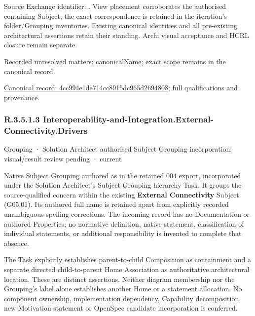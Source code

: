 Source Exchange identifier: \texttt{}. View placement corroborates
the authorised containing Subject; the exact correspondence is retained in the
iteration's folder/Grouping inventories. Existing canonical identities and all
pre-existing architectural assertions retain their standing. Archi visual
acceptance and HCRL closure remain separate.


{\small Recorded unresolved matters: canonicalName; exact scope remains in the canonical record.}\par
{\footnotesize \href{../../../../continuum/grouping/4cc994e1de714cc8915dc965d2694808.md}{Canonical record: 4cc994e1de714cc8915dc965d2694808}; full qualifications and provenance.}\par
\subsubsection*{R.3.5.1.3 Interoperability-and-Integration.External-Connectivity.Drivers}
\label{navigation:R.3.5.1.3}

\label{element:3f830af6837d4f89bcd042039572bcdc}
{\small Grouping · Solution Architect authorised Subject Grouping incorporation; visual/result review pending · current}\par

Native Subject Grouping authored as \texttt{} in the retained 004 export,
incorporated under the Solution Architect's Subject Grouping hierarchy Task.
It groups the source-qualified \texttt{} concern within
the existing \textbf{External Connectivity} Subject (G05.01). Its authored full name
is retained apart from explicitly recorded unambiguous spelling corrections.
The incoming record has no Documentation or authored Properties; no normative
definition, native statement, classification of individual statements, or
additional responsibility is invented to complete that absence.



The Task explicitly establishes parent-to-child Composition as containment and
a separate directed child-to-parent Home Association as authoritative architectural
location. These are distinct assertions. Neither diagram membership nor the
Grouping's label alone establishes another Home or a statement allocation.
No component ownership, implementation dependency, Capability decomposition,
new Motivation statement or OpenSpec candidate incorporation is conferred.




